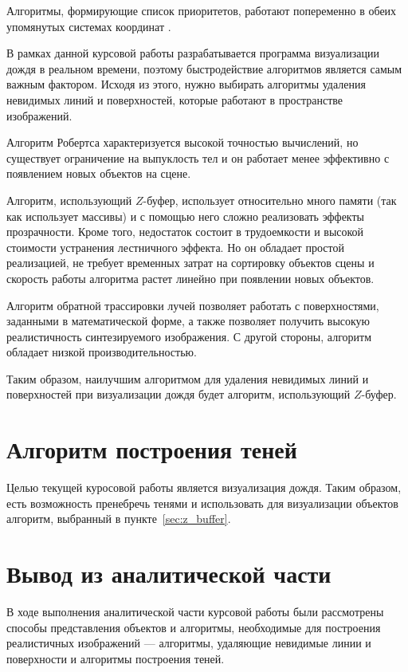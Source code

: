 Алгоритмы, формирующие список приоритетов, работают попеременно в обеих упомянутых системах координат \cite{Demin2005}.

В рамках данной курсовой работы разрабатывается программа визуализации дождя в реальном времени, поэтому быстродействие алгоритмов является самым важным фактором. Исходя из этого, нужно выбирать алгоритмы удаления невидимых линий и поверхностей, которые работают в пространстве изображений.

Алгоритм Робертса характеризуется высокой точностью вычислений, но существует ограничение на выпуклость тел и он работает менее эффективно с появлением новых объектов на сцене.

Алгоритм, использующий $Z$-буфер, использует относительно много памяти (так как использует массивы) и с помощью него сложно реализовать эффекты прозрачности. 
Кроме того, недостаток состоит в трудоемкости и высокой стоимости устранения лестничного эффекта. 
Но он обладает простой реализацией, не требует временных затрат на сортировку объектов сцены и скорость работы алгоритма растет линейно при появлении новых объектов.

Алгоритм обратной трассировки лучей позволяет работать с поверхностями, заданными в математической форме, а также позволяет получить высокую реалистичность синтезируемого изображения. 
С другой стороны, алгоритм обладает низкой производительностью.

Таким образом, наилучшим алгоритмом для удаления невидимых линий и поверхностей при визуализации дождя будет алгоритм, использующий $Z$-буфер.

\section{Алгоритм построения теней}

Целью текущей куросовой работы является визуализация дождя. Таким образом, есть возможность пренебречь тенями и использовать для визуализации объектов алгоритм, выбранный в пункте~\ref{sec:z_buffer}.

\section*{Вывод из аналитической части}

В ходе выполнения аналитической части курсовой работы были рассмотрены способы представления объектов и алгоритмы, необходимые для построения реалистичных изображений --- алгоритмы, удаляющие невидимые линии и поверхности и алгоритмы построения теней.


